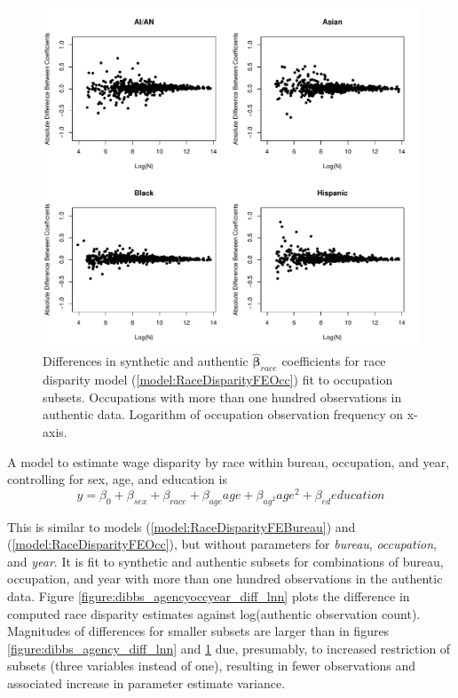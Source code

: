 \documentclass[10pt, letterpaper]{article}
\newcommand{\mest}[1]{\hat{\bm{#1}}}
\begin{document}
\begin{spacing}{1.0}
\vspace{20pt}

\begin{figure}[h!]
    \centering
    \includegraphics[width=6in]{dibbs_occ_diff_lnn.pdf}
    \caption{Differences in synthetic and authentic $\mest{\beta}_{race}$ coefficients for race disparity model (\ref{model:RaceDisparityFEOcc}) fit to occupation subsets.  Occupations with more than one hundred observations in authentic data.  Logarithm of occupation observation frequency on x-axis.}
    \label{figure:dibbs_occ_diff_lnn}
\end{figure}

\clearpage

A model to estimate wage disparity by race within bureau, occupation, and year, controlling for sex, age, and education is\\[-16pt]

\begin{equation} y=\beta_0+\beta_{sex}+\beta_{race}+\beta_{age}age+\beta_{ag^2}age^2+\beta_{ed}education
\label{model:RaceDisparityFEBurOccYear}
\end{equation}

This is similar to models (\ref{model:RaceDisparityFEBureau}) and (\ref{model:RaceDisparityFEOcc}), but without parameters for \textit{bureau}, \textit{occupation}, and \textit{year}.  It is fit to synthetic and authentic subsets for combinations of bureau, occupation, and year with more than one hundred observations in the authentic data.  Figure \ref{figure:dibbs_agencyoccyear_diff_lnn} plots the difference in computed race disparity estimates against log(authentic observation count).  Magnitudes of differences for smaller subsets are larger than in figures \ref{figure:dibbs_agency_diff_lnn} and \ref{figure:dibbs_occ_diff_lnn} due, presumably, to increased restriction of subsets (three variables instead of one), resulting in fewer observations and associated increase in parameter estimate variance.\\


\end{spacing}
\end{document}
